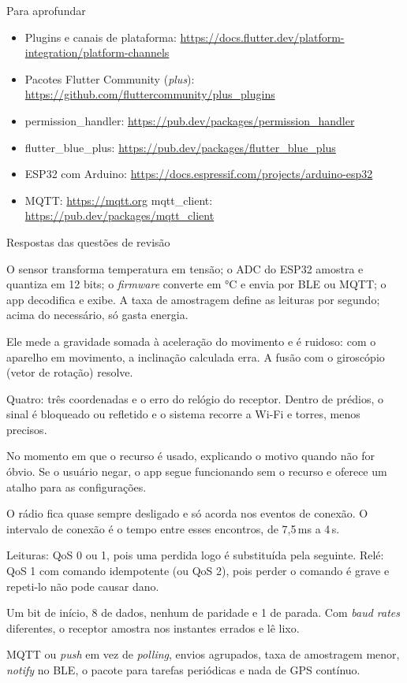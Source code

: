 \documentclass[aspectratio=169,10pt]{beamer}
\begin{document}
\begin{frame}{Para aprofundar}
  \small
  \begin{itemize}
    \item Plugins e canais de plataforma: \url{https://docs.flutter.dev/platform-integration/platform-channels}
    \item Pacotes Flutter Community (\emph{plus}): \url{https://github.com/fluttercommunity/plus_plugins}
    \item permission\_handler: \url{https://pub.dev/packages/permission_handler}
    \item flutter\_blue\_plus: \url{https://pub.dev/packages/flutter_blue_plus}
    \item ESP32 com Arduino: \url{https://docs.espressif.com/projects/arduino-esp32}
    \item MQTT: \url{https://mqtt.org} \quad mqtt\_client: \url{https://pub.dev/packages/mqtt_client}
  \end{itemize}
\end{frame}

\begin{frame}{Respostas das questões de revisão}
  \begin{respostas}
    \item O sensor transforma temperatura em tensão; o ADC do ESP32 amostra e quantiza em 12 bits; o \emph{firmware} converte em °C e envia por BLE ou MQTT; o app decodifica e exibe. A taxa de amostragem define as leituras por segundo; acima do necessário, só gasta energia.
    \item Ele mede a gravidade somada à aceleração do movimento e é ruidoso: com o aparelho em movimento, a inclinação calculada erra. A fusão com o giroscópio (vetor de rotação) resolve.
    \item Quatro: três coordenadas e o erro do relógio do receptor. Dentro de prédios, o sinal é bloqueado ou refletido e o sistema recorre a Wi-Fi e torres, menos precisos.
    \item No momento em que o recurso é usado, explicando o motivo quando não for óbvio. Se o usuário negar, o app segue funcionando sem o recurso e oferece um atalho para as configurações.
    \item O rádio fica quase sempre desligado e só acorda nos eventos de conexão. O intervalo de conexão é o tempo entre esses encontros, de 7,5\,ms a 4\,s.
    \item Leituras: QoS 0 ou 1, pois uma perdida logo é substituída pela seguinte. Relé: QoS 1 com comando idempotente (ou QoS 2), pois perder o comando é grave e repeti-lo não pode causar dano.
    \item Um bit de início, 8 de dados, nenhum de paridade e 1 de parada. Com \emph{baud rates} diferentes, o receptor amostra nos instantes errados e lê lixo.
    \item MQTT ou \emph{push} em vez de \emph{polling}, envios agrupados, taxa de amostragem menor, \emph{notify} no BLE, o pacote  para tarefas periódicas e nada de GPS contínuo.
  \end{respostas}
\end{frame}

\end{document}

